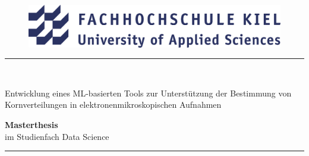 \documentclass[
  12pt,
  openany]{book}
\author{}
\date{\vspace{-2.5em}}
\begin{document}
\begin{titlepage}
	\thispagestyle{empty}
\begin{figure}[H]	%
	\centering
	\includegraphics[width = 14cm]{../imgs/FH_Kiel_Logo.png} %
\end{figure}
	\begin{center}
		\newcommand{\HRule}{\rule{\linewidth}{0.5mm}}
		\HRule \\[0.4cm]
	\begin{spacing}{2.0}
	{\huge Entwicklung eines ML-basierten Tools zur Unterstützung der Bestimmung von Kornverteilungen in elektronenmikroskopischen Aufnahmen}
	\\\vspace*{0.5cm}
	\end{spacing}
	{\Large \textbf{Masterthesis}}\\
	{\Large im Studienfach \glqq{}Data Science\grqq{}}
	\HRule
	\\\vspace*{1.5cm}


\end{center}
\end{titlepage}
\end{document}
